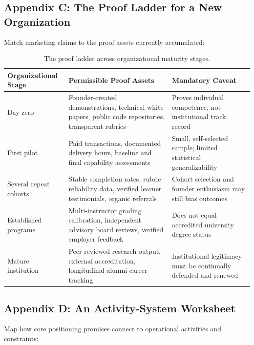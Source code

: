 \subsection*{Appendix C: The Proof Ladder for a New Organization}

Match marketing claims to the proof assets currently accumulated:

\begin{table}[t]
\centering
\small
\begin{tabularx}{\textwidth}{>{\raggedright\arraybackslash}p{3cm} >{\raggedright\arraybackslash}X >{\raggedright\arraybackslash}X}
\toprule
\textbf{Organizational Stage} & \textbf{Permissible Proof Assets} & \textbf{Mandatory Caveat} \\
\midrule
Day zero & Founder-created demonstrations, technical white papers, public code repositories, transparent rubrics & Proves individual competence, not institutional track record \\
First pilot & Paid transactions, documented delivery hours, baseline and final capability assessments & Small, self-selected sample; limited statistical generalizability \\
Several repeat cohorts & Stable completion rates, rubric reliability data, verified learner testimonials, organic referrals & Cohort selection and founder enthusiasm may still bias outcomes \\
Established programs & Multi-instructor grading calibration, independent advisory board reviews, verified employer feedback & Does not equal accredited university degree status \\
Mature institution & Peer-reviewed research output, external accreditation, longitudinal alumni career tracking & Institutional legitimacy must be continually defended and renewed \\
\bottomrule
\end{tabularx}
\caption{The proof ladder across organizational maturity stages.}
\label{tab:ch8-app-proof-ladder}
\end{table}

\subsection*{Appendix D: An Activity-System Worksheet}

Map how core positioning promises connect to operational activities and constraints:

